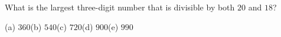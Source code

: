 What is the largest three-digit number that is divisible by both $20$ and $18$?

(a) $360$\quad (b) $540$\quad (c) $720$\quad (d) $900$\quad (e) $990$
